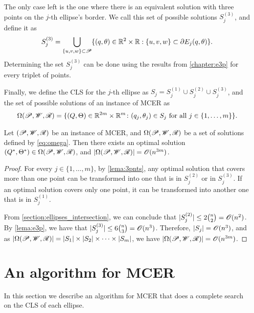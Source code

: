 The only case left is the one where there is an equivalent solution with three points on the $j$-th ellipse's border. We call this set of possible solutions $S_j^{(3)}$, and define it as
\begin{equation}
	S_j^{(3)} = \bigcup_{\{u, v, w\} \subset \mathscr{P}} \{(q, \theta)\in \mathbb{R}^2\times\mathbb{R}: \{u, v, w\} \subset \partial E_j(q, \theta)\}.
\end{equation}
Determining the set $S_j^{(3)}$ can be done using the results from \autoref{chapter:e3p} for every triplet of points.

Finally, we define the CLS for the $j$-th ellipse as $S_j = S_j^{(1)} \cup S_j^{(2)} \cup S_j^{(3)}$, and the set of possible solutions of an instance of MCER as
\begin{equation}\label{eq:omega}
\Omega(\mathscr{P}, \mathscr{W}, \mathscr{R}) = \{(Q, \Theta)\in \mathbb{R}^{2m}\times\mathbb{R}^m \colon (q_j, \theta_j) \in S_j \textnormal{ for all } j\in\{1, \dots, m\}\}.
\end{equation}

\begin{theorem}\label{th:mcer}
	Let $(\mathscr{P}, \mathscr{W}, \mathscr{R})$ be an instance of MCER, and $\Omega(\mathscr{P}, \mathscr{W}, \mathscr{R})$ be a set of solutions defined by \autoref{eq:omega}. Then there exists an optimal solution $(Q^*, \Theta^*) \in \Omega(\mathscr{P}, \mathscr{W}, \mathscr{R})$, and $|\Omega(\mathscr{P}, \mathscr{W}, \mathscr{R})|=\mathscr{O}(n^{3m})$.	
\end{theorem}

\begin{proof}
	For every $j \in \{1, \dots, m\}$, by \autoref{lema:3pnts}, any optimal solution that covers more than one point can be transformed into one that is in $S_j^{(2)}$ or in $S_j^{(3)}$.
	If an optimal solution covers only one point, it can be transformed into another one that is in $S_j^{(1)}$.
	
	From \autoref{section:ellipses_intersection}, we can conclude that $|S_j^{(2)}|\le 2\binom{n}{2} = \mathscr{O}(n^2)$.
	By \autoref{lema:e3p}, we have that $|S_j^{(3)}| \le 6\binom{n}{3} = \mathscr{O}(n^3)$.
	Therefore, $|S_j|=\mathscr{O}(n^3)$, and as $|\Omega(\mathscr{P}, \mathscr{W}, \mathscr{R})|= |S_1|\times|S_2|\times\dots\times|S_m|$, we have $|\Omega(\mathscr{P}, \mathscr{W}, \mathscr{R})|=\mathscr{O}(n^{3m})$.
\end{proof}

\section{An algorithm for MCER}

In this section we describe an algorithm for MCER that does a complete search on the CLS of each ellipse.

